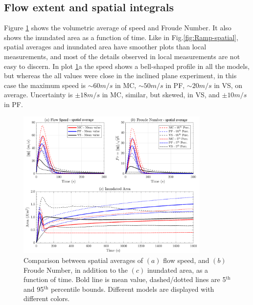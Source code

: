 \documentclass{article}
\begin{document}
\subsection{Flow extent and spatial integrals}
Figure \ref{fig:Colima-spatial} shows the volumetric average of speed and Froude Number. It also shows the inundated area as a function of time. Like in Fig.\ref{fig:Ramp-spatial}, spatial averages and inundated area have smoother plots than local measurements, and most of the details observed in local measurements are not easy to discern. In plot \ref{fig:Colima-spatial}a the speed shows a bell-shaped profile in all the models, but whereas the all values were close in the inclined plane experiment, in this case the maximum speed is $\sim 60 m/s$ in MC, $\sim 50 m/s$ in PF, $\sim 20 m/s$ in VS, on average. Uncertainty is $\pm 18 m/s$ in MC, similar, but skewed, in VS, and $\pm 10 m/s$ in PF.
\begin{figure}[H]
        \centering
        \includegraphics[width=0.85\textwidth]{figures/Colima/AveragedColima.png}
        \caption{Comparison between spatial averages of $(a)$ flow speed, and $(b)$ Froude Number, in addition to the $(c)$ inundated area, as a function of time. Bold line is mean value, dashed/dotted lines are 5$^{\mathrm{th}}$ and 95$^{\mathrm{th}}$ percentile bounds. Different models are displayed with different colors.}
        \label{fig:Colima-spatial}
\end{figure}
\end{document}
